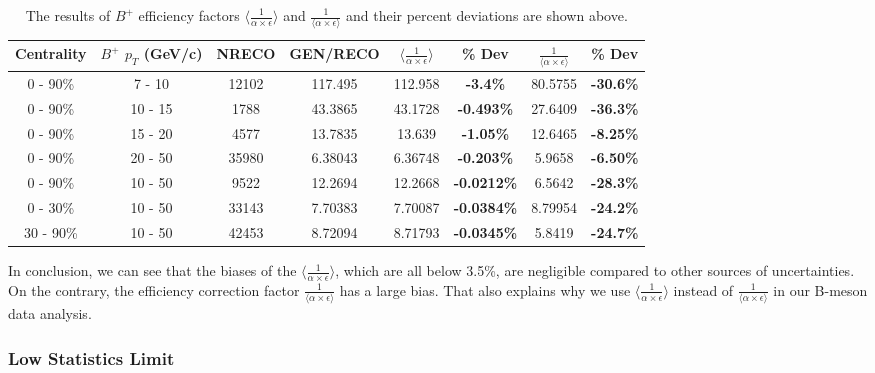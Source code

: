 \begin{table}[h]
\begin{center}
\caption{The results of $B^+$ efficiency factors $\langle \frac{1}{\alpha \times \epsilon} \rangle$ and $\frac{1}{\langle \alpha \times \epsilon \rangle}$ and their percent deviations are shown above.}
\vspace{1em}
\label{BPHighStat}
  \begin{tabular}{| c | c |c |c |c | c |  c| c|}
    \hline
     Centrality &  $B^+$   $p_T$ (GeV/c) & NRECO & GEN/RECO &  $\langle \frac{1}{\alpha \times \epsilon} \rangle$  & \% Dev & $\frac{1}{\langle \alpha \times \epsilon \rangle}$ &  \% Dev \\
    \hline
    \hline
0 - 90\% & 7 - 10 & 12102 & 117.495 & 112.958 & \textbf{-3.4\% }& 80.5755 &  \textbf{-30.6\% }   \\ 
0 - 90\% & 10 - 15 & 1788 & 43.3865 & 43.1728 & \textbf{-0.493\% }& 27.6409 &  \textbf{-36.3\% }   \\ 
0 - 90\% & 15 - 20 & 4577 & 13.7835 & 13.639 & \textbf{-1.05\% }& 12.6465 &  \textbf{-8.25\% }   \\ 
0 - 90\% & 20 - 50 & 35980 & 6.38043 & 6.36748 & \textbf{-0.203\% }& 5.9658 &  \textbf{-6.50\% }   \\ 
0 - 90\% & 10 - 50 & 9522 & 12.2694 & 12.2668 & \textbf{-0.0212\% }& 6.5642 &  \textbf{-28.3\% }   \\ 
0 - 30\% & 10 - 50 & 33143 & 7.70383 & 7.70087 & \textbf{-0.0384\% }& 8.79954 &  \textbf{-24.2\% }   \\ 
30 - 90\% & 10 - 50 & 42453 & 8.72094 & 8.71793 & \textbf{-0.0345\% }& 5.8419 &  \textbf{-24.7\% }   \\ 
    \hline
    \hline
\end{tabular}
\end{center}
\end{table}


In conclusion, we can see that the biases of the $\langle \frac{1}{\alpha \times \epsilon}\rangle$, which are all below 3.5\%, are negligible compared to other sources of uncertainties. On the contrary, the efficiency correction factor $\frac{1}{\langle \alpha \times \epsilon \rangle}$ has a large bias. That also explains why we use $\langle \frac{1}{\alpha \times \epsilon}\rangle$ instead of $\frac{1}{\langle \alpha \times \epsilon \rangle}$ in our B-meson data analysis.



\subsubsection{Low Statistics Limit}

